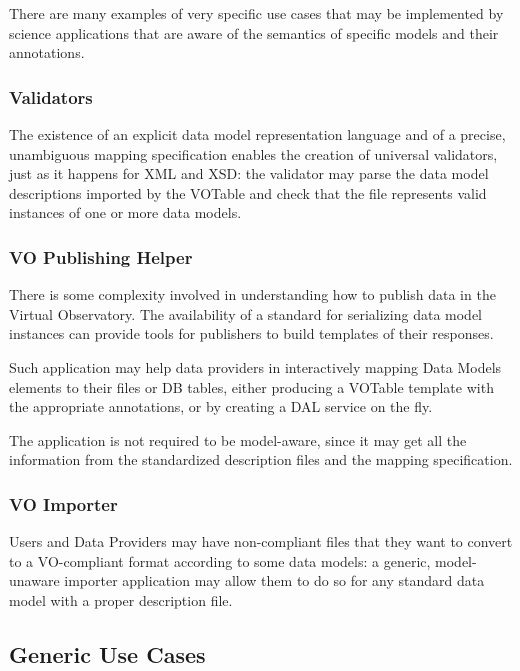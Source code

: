 \documentclass[11pt,a4paper]{ivoa}
\begin{document}
There are many examples of very specific use cases that may be
implemented by science applications that are aware of the semantics of
specific models and their annotations.

\subsubsection{Validators}\label{validators}

The existence of an explicit data model representation language and of a
precise, unambiguous mapping specification enables the creation of
universal validators, just as it happens for XML and XSD: the validator
may parse the data model descriptions imported by the VOTable and check
that the file represents valid instances of one or more data models.

\subsubsection{VO Publishing Helper}\label{vo-publishing-helper}

There is some complexity involved in understanding how to publish data
in the Virtual Observatory. The availability of a standard for
serializing data model instances can provide tools for publishers to
build templates of their responses.

Such application may help data providers in interactively mapping Data
Models elements to their files or DB tables, either producing a VOTable
template with the appropriate annotations, or by creating a DAL service
on the fly.

The application is not required to be model-aware, since it may get all
the information from the standardized description files and the mapping
specification.

\subsubsection{VO Importer}\label{vo-importer}

Users and Data Providers may have non-compliant files that they want to
convert to a VO-compliant format according to some data models: a
generic, model-unaware importer application may allow them to do so for
any standard data model with a proper description file.

\subsection{Generic Use Cases}\label{generic-use-cases}
\end{document}

